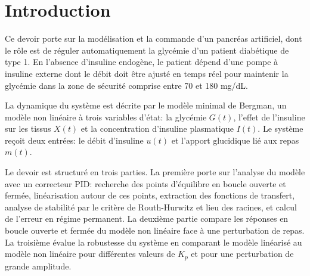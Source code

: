 \section*{Introduction}

Ce devoir porte sur la modélisation et la commande d'un pancréas artificiel, dont le rôle est de réguler automatiquement la glycémie d'un patient diabétique de type 1. En l'absence d'insuline endogène, le patient dépend d'une pompe à insuline externe dont le débit doit être ajusté en temps réel pour maintenir la glycémie dans la zone de sécurité comprise entre 70 et 180 mg/dL.

La dynamique du système est décrite par le modèle minimal de Bergman, un modèle non linéaire à trois variables d'état: la glycémie $G(t)$, l'effet de l'insuline sur les tissus $X(t)$ et la concentration d'insuline plasmatique $I(t)$. Le système reçoit deux entrées: le débit d'insuline $u(t)$ et l'apport glucidique lié aux repas $m(t)$.

Le devoir est structuré en trois parties. La première porte sur l'analyse du modèle avec un correcteur PID: recherche des points d'équilibre en boucle ouverte et fermée, linéarisation autour de ces points, extraction des fonctions de transfert, analyse de stabilité par le critère de Routh-Hurwitz et lieu des racines, et calcul de l'erreur en régime permanent. La deuxième partie compare les réponses en boucle ouverte et fermée du modèle non linéaire face à une perturbation de repas. La troisième évalue la robustesse du système en comparant le modèle linéarisé au modèle non linéaire pour différentes valeurs de $K_p$ et pour une perturbation de grande amplitude.
